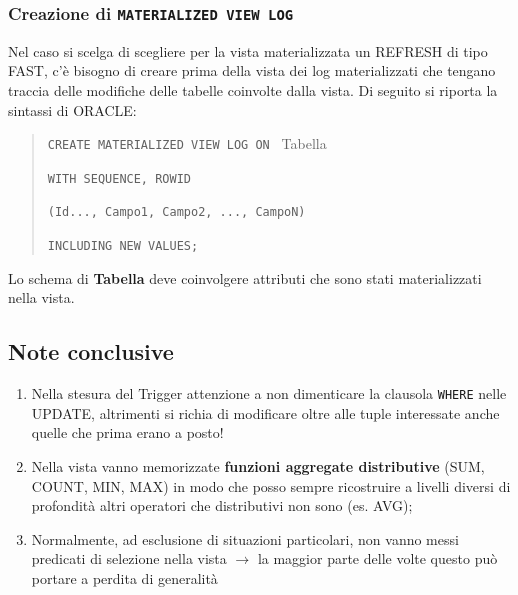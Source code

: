 \documentclass[12pt]{article}
\begin{document}
\subsubsection{Creazione di \texttt{MATERIALIZED VIEW LOG}}
Nel caso si scelga di scegliere per la vista materializzata un REFRESH di tipo FAST, c'è bisogno di creare prima della vista dei log materializzati che tengano traccia delle modifiche delle tabelle coinvolte dalla vista. Di seguito si riporta la sintassi di ORACLE:

\begin{quote}
    \texttt{CREATE MATERIALIZED VIEW LOG ON } Tabella

\texttt{WITH SEQUENCE, ROWID }

\texttt{(Id..., Campo1, Campo2, ..., CampoN)}

\texttt{INCLUDING NEW VALUES;}
\end{quote}

Lo schema di \textbf{Tabella} deve coinvolgere attributi che sono stati materializzati nella vista. 

\subsection{Note conclusive}
\begin{enumerate}
    \item Nella stesura del Trigger attenzione a non dimenticare la clausola \texttt{WHERE} nelle UPDATE, altrimenti si richia di modificare oltre alle tuple interessate anche quelle che prima erano a posto!
    \item Nella vista vanno memorizzate \textbf{funzioni aggregate distributive} (SUM,  COUNT, MIN, MAX) in modo che posso sempre ricostruire a livelli diversi di profondità altri operatori che distributivi non sono (es. AVG); 
    \item Normalmente, ad esclusione di situazioni particolari, non vanno messi predicati di selezione nella vista $\rightarrow$ la maggior parte delle volte questo può portare a perdita di generalità
\end{enumerate} 
\end{document}
